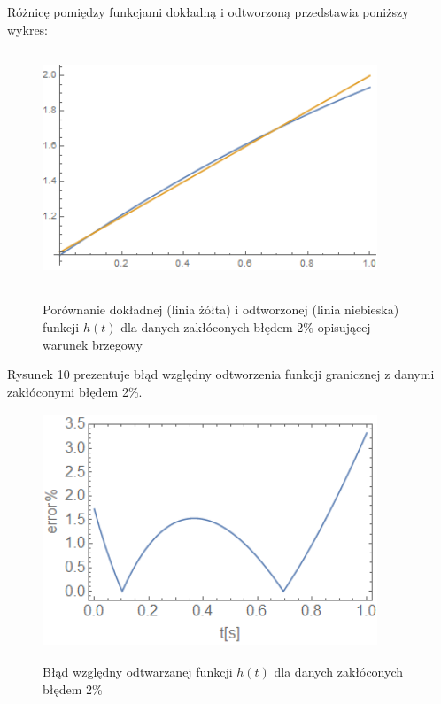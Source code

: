 \documentclass[twoside]{projektInzynierskiMS1}
\begin{document}
Różnicę pomiędzy funkcjami dokładną i odtworzoną przedstawia poniższy wykres: \\

\begin{figure}[H]
\begin{center}
		\includegraphics[height=7cm, width=10cm]{pics/2reconstruction.png}\\
	\caption{Porównanie dokładnej (linia żółta) i odtworzonej (linia niebieska) funkcji $h(t)$ dla danych zakłóconych błędem 2\% opisującej warunek brzegowy}
\end{center}
\end{figure}

Rysunek 10 prezentuje błąd względny odtworzenia funkcji granicznej z danymi zakłóconymi błędem 2\%. \\

\begin{figure}[H]
\begin{center}
		\includegraphics[height=7cm, width=10cm]{pics/2abs.png}\\
	\caption{Błąd względny odtwarzanej funkcji $h(t)$ dla danych zakłóconych błędem 2\%}
\end{center}
\end{figure}
\end{document}
